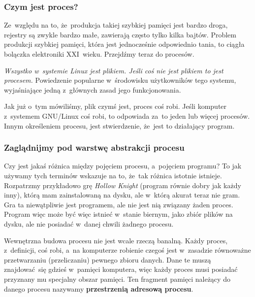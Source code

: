 \documentclass[10pt,t]{beamer}
\begin{document}
\begin{frame}
  \frametitle{Czym jest proces?}


  Ze~względu na to, że~produkcja takiej szybkiej pamięci jest bardzo droga,
  rejestry są zwykle bardzo małe, zawierają często tylko \alert{kilka}
  bajtów. Problem produkcji szybkiej pamięci, która jest jednocześnie
  odpowiednio tania, to ciągła bolączka elektroniki XXI~wieku. Przejdźmy
  teraz do procesów.

  \textit{Wszystko w~systemie Linux jest plikiem. Jeśli coś nie jest
    plikiem to jest procesem.} Powiedzenie popularne w~środowisku
  użytkowników tego systemu, wyjaśniające jedną z~głównych zasad
  jego funkcjonowania.

  Jak już o~tym mówiliśmy, plik czymś jest, proces coś robi. Jeśli
  komputer z~systemem GNU/Linux coś robi, to odpowiada za~to jeden lub
  więcej procesów. Innym określeniem procesu, jest stwierdzenie, że~jest
  to \alert{działający program}.

\end{frame}





\begin{frame}
  \frametitle{Zaglądnijmy pod warstwę abstrakcji procesu}


  Czy jest jakaś różnica między pojęciem procesu, a~pojęciem programu?
  To jak używamy tych terminów wskazuje na to, że~tak różnica istotnie
  istnieje. Rozpatrzmy przykładowo grę \textit{Hollow Knight} (program
  równie dobry jak każdy inny), którą mam zainstalowaną na dysku, ale
  w~którą akurat teraz nie gram. Gra ta niewątpliwie jest programem, ale
  nie jest nią związany żaden proces. Program więc może być więc istnieć
  w~stanie biernym, jako zbiór plików na dysku, ale nie posiadać w~danej
  chwili żadnego procesu.

  Wewnętrzna budowa procesu nie jest wcale rzeczą banalną. Każdy proces,
  z~definicji, coś robi, a~na komputerze robienie czegoś jest w~zasadzie
  równoważne przetwarzaniu (przeliczaniu) pewnego zbioru danych. Dane te
  muszą znajdować~się gdzieś w~pamięci komputera, więc każdy proces musi
  posiadać przyznany mu specjalny obszar pamięci. Ten fragment pamięci
  należący do danego procesu nazywamy \textbf{przestrzenią adresową
    procesu}.

\end{frame}
\end{document}
